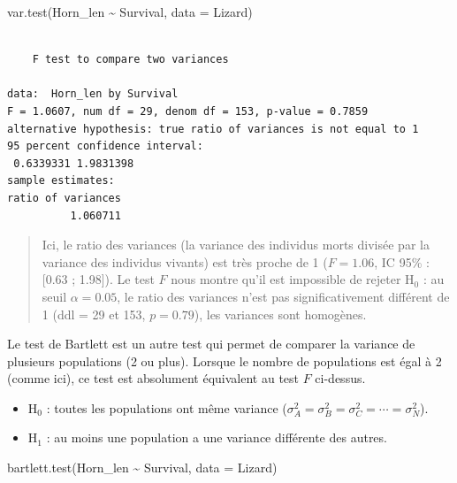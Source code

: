 \documentclass[
  a4paper,
  DIV=11,
  numbers=noendperiod,
  oneside]{scrreprt}
\newenvironment{Shaded}{}{}
\newcommand{\AttributeTok}[1]{\textcolor[rgb]{0.84,0.23,0.29}{#1}}
\newcommand{\FunctionTok}[1]{\textcolor[rgb]{0.44,0.26,0.76}{#1}}
\newcommand{\NormalTok}[1]{\textcolor[rgb]{0.14,0.16,0.18}{#1}}
\newcommand{\SpecialCharTok}[1]{\textcolor[rgb]{0.00,0.36,0.77}{#1}}
\providecommand{\tightlist}{%
  \setlength{\itemsep}{0pt}\setlength{\parskip}{0pt}}\usepackage{longtable,booktabs,array}
\begin{document}
\begin{Shaded}
\begin{Highlighting}[]
\FunctionTok{var.test}\NormalTok{(Horn\_len }\SpecialCharTok{\textasciitilde{}}\NormalTok{ Survival, }\AttributeTok{data =}\NormalTok{ Lizard)}
\end{Highlighting}
\end{Shaded}

\begin{verbatim}

    F test to compare two variances

data:  Horn_len by Survival
F = 1.0607, num df = 29, denom df = 153, p-value = 0.7859
alternative hypothesis: true ratio of variances is not equal to 1
95 percent confidence interval:
 0.6339331 1.9831398
sample estimates:
ratio of variances 
          1.060711 
\end{verbatim}

\begin{quote}
Ici, le ratio des variances (la variance des individus morts divisée par
la variance des individus vivants) est très proche de 1 (\(F = 1.06\),
IC 95\% : {[}0.63 ; 1.98{]}). Le test \(F\) nous montre qu'il est
impossible de rejeter H\(_0\) : au seuil \(\alpha = 0.05\), le ratio des
variances n'est pas significativement différent de 1 (ddl = 29 et 153,
\(p = 0.79\)), les variances sont homogènes.
\end{quote}

Le test de Bartlett est un autre test qui permet de comparer la variance
de plusieurs populations (2 ou plus). Lorsque le nombre de populations
est égal à 2 (comme ici), ce test est absolument équivalent au test
\(F\) ci-dessus.

\begin{itemize}
\tightlist
\item
  H\(_0\) : toutes les populations ont même variance
  (\(\sigma^2_A = \sigma^2_B = \sigma^2_C = \cdots = \sigma^2_N\)).
\item
  H\(_1\) : au moins une population a une variance différente des
  autres.
\end{itemize}

\begin{Shaded}
\begin{Highlighting}[]
\FunctionTok{bartlett.test}\NormalTok{(Horn\_len }\SpecialCharTok{\textasciitilde{}}\NormalTok{ Survival, }\AttributeTok{data =}\NormalTok{ Lizard)}
\end{Highlighting}
\end{Shaded}
\end{document}
